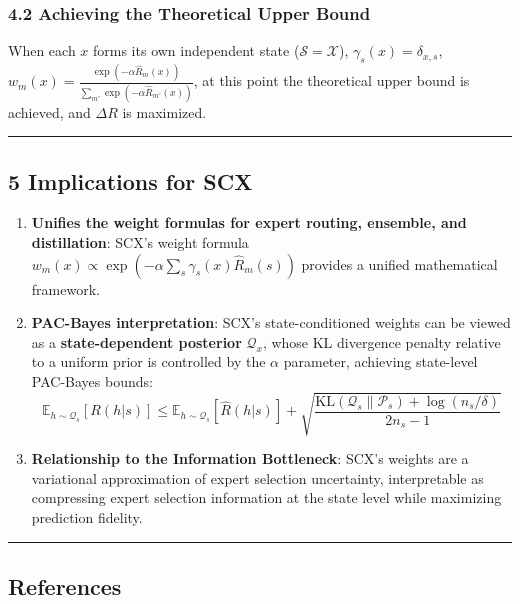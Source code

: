 \documentclass[
  12pt,
]{article}
\begin{document}
\subsubsection{4.2 Achieving the Theoretical Upper Bound}\label{achieving-upper-bound}

When each \(x\)
forms its own independent state (\(\mathcal{S} = \mathcal{X}\)), \(\gamma_s(x) = \delta_{x,s}\), \(w_m(x) = \frac{\exp(-\alpha \hat{R}_m(x))}{\sum_{m'} \exp(-\alpha \hat{R}_{m'}(x))}\), at this point the theoretical upper bound is achieved, and \(\Delta R\)
is maximized.

\begin{center}\rule{0.5\linewidth}{0.5pt}\end{center}

\subsection{5 Implications for SCX}\label{implications-for-scx}

\begin{enumerate}
\def\labelenumi{\arabic{enumi}.}
\item
  \textbf{Unifies the weight formulas for expert routing, ensemble, and distillation}: SCX's
  weight formula
  \(w_m(x) \propto \exp(-\alpha \sum_s \gamma_s(x) \hat{R}_m(s))\)
  provides a unified mathematical framework.
\item
  \textbf{PAC-Bayes interpretation}: SCX's
  state-conditioned weights can be viewed as a \textbf{state-dependent posterior}
  \(\mathcal{Q}_x\), whose KL divergence penalty relative to a uniform prior is controlled by the \(\alpha\)
  parameter, achieving state-level PAC-Bayes bounds:
  \[\mathbb{E}_{h \sim \mathcal{Q}_s}[R(h|s)] \leq \mathbb{E}_{h \sim \mathcal{Q}_s}[\hat{R}(h|s)] + \sqrt{\frac{\text{KL}(\mathcal{Q}_s \| \mathcal{P}_s) + \log(n_s/\delta)}{2n_s - 1}}\]
\item
  \textbf{Relationship to the Information Bottleneck}: SCX's
  weights are a variational approximation of expert selection uncertainty, interpretable as compressing expert selection information at the state level while maximizing prediction fidelity.
\end{enumerate}

\begin{center}\rule{0.5\linewidth}{0.5pt}\end{center}

\subsection{References}\label{references-prop3}
\end{document}
